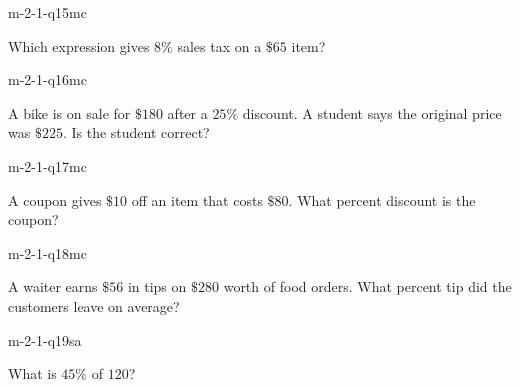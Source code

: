 \begin{practiceQuestion}{m-2-1-q15}{mc}
\begin{questionText}
Which expression gives $8\%$ sales tax on a $\$65$ item?
\end{questionText}
\end{practiceQuestion}

\begin{practiceQuestion}{m-2-1-q16}{mc}
\begin{questionText}
A bike is on sale for $\$180$ after a $25\%$ discount. A student says the original price was $\$225$. Is the student correct?
\end{questionText}
\end{practiceQuestion}

\begin{practiceQuestion}{m-2-1-q17}{mc}
\begin{questionText}
A coupon gives $\$10$ off an item that costs $\$80$. What percent discount is the coupon?
\end{questionText}
\end{practiceQuestion}

\begin{practiceQuestion}{m-2-1-q18}{mc}
\begin{questionText}
A waiter earns $\$56$ in tips on $\$280$ worth of food orders. What percent tip did the customers leave on average?
\end{questionText}
\end{practiceQuestion}


\begin{practiceQuestion}{m-2-1-q19}{sa}
\begin{questionText}
What is $45\%$ of $120$?
\end{questionText}
\end{practiceQuestion}

